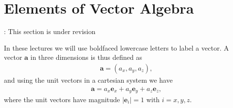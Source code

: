 \documentclass[letterpaper,10pt,english]{sphinxmanual}
\begin{document}
\section{Elements of Vector Algebra}
\label{\detokenize{chapter1:elements-of-vector-algebra}}
: This section is under revision

In these lectures we will use boldfaced lower\sphinxhyphen{}case letters to label a vector. A vector \(\boldsymbol{a}\) in three dimensions is thus defined as
\begin{equation*}
\begin{split}
\boldsymbol{a} =(a_x,a_y, a_z),
\end{split}
\end{equation*}
and using the unit vectors in a cartesian system we have
\begin{equation*}
\begin{split}
\boldsymbol{a} = a_x\boldsymbol{e}_x+a_y\boldsymbol{e}_y+a_z\boldsymbol{e}_z,
\end{split}
\end{equation*}
where the unit vectors have magnitude \(\vert\boldsymbol{e}_i\vert = 1\) with \(i=x,y,z\).
\end{document}
